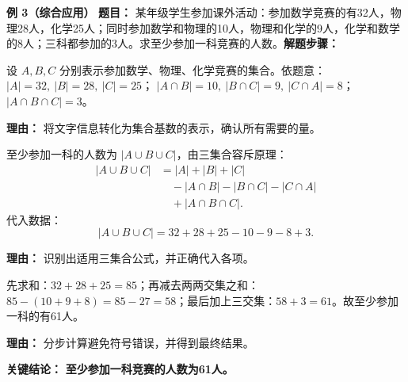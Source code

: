 \begin{examplebox}
	\medskip
	\textbf{\textcolor{CExample}{例 3（综合应用）}}
	\textbf{\textcolor{CExample}{题目：}} 某年级学生参加课外活动：参加数学竞赛的有32人，物理28人，化学25人；同时参加数学和物理的10人，物理和化学的9人，化学和数学的8人；三科都参加的3人。求至少参加一科竞赛的人数。\textbf{\textcolor{CExample}{解题步骤：}}
	\begin{description}[style=nextline, leftmargin=2.8em, labelsep=0.5em, itemsep=0.45em]
		\item[\textbf{第一步（定义集合与数据）：}]
			设 $A,B,C$ 分别表示参加数学、物理、化学竞赛的集合。依题意： $|A|=32,\ |B|=28,\ |C|=25$； $|A\cap B|=10,\ |B\cap C|=9,\ |C\cap A|=8$； $|A\cap B\cap C|=3$。
			\par\textbf{理由：} 将文字信息转化为集合基数的表示，确认所有需要的量。
		\item[\textbf{第二步（应用三集合公式）：}]
			至少参加一科的人数为 $|A\cup B\cup C|$，由三集合容斥原理：
			\[
				\begin{aligned}
					|A\cup B\cup C| &= |A|+|B|+|C| \\ &\quad - |A\cap B| - |B\cap C| - |C\cap A| \\ &\quad + |A\cap B\cap C|.
			\end{aligned}
			\]
			代入数据：
			\[
				|A\cup B\cup C| = 32 + 28 + 25 - 10 - 9 - 8 + 3.
			\]
			\par\textbf{理由：} 识别出适用三集合公式，并正确代入各项。
		\item[\textbf{第三步（分步计算并作答）：}]
			先求和：$32+28+25 = 85$；再减去两两交集之和：$85 - (10+9+8) = 85 - 27 = 58$；最后加上三交集：$58 + 3 = 61$。故至少参加一科的有61人。
			\par\textbf{理由：} 分步计算避免符号错误，并得到最终结果。
	\end{description}
	\textbf{\textcolor{CExample}{关键结论：}}
	\textbf{至少参加一科竞赛的人数为61人。}
\end{examplebox}
